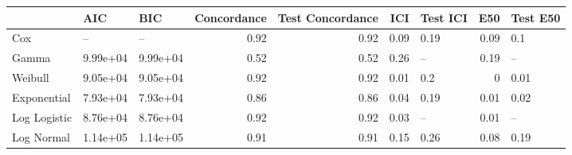 \begin{table*}
\centering
\label{tab:afr_models}
\begin{tabular}{lllrrrlrl}
\toprule
 & AIC & BIC & Concordance & Test Concordance & ICI & Test ICI & E50 & Test E50 \\
\midrule
Cox & -- & -- & 0.92 & 0.92 & 0.09 & 0.19 & 0.09 & 0.1 \\
Gamma & 9.99e+04 & 9.99e+04 & 0.52 & 0.52 & 0.26 & -- & 0.19 & -- \\
Weibull & 9.05e+04 & 9.05e+04 & 0.92 & 0.92 & 0.01 & 0.2 & 0 & 0.01 \\
Exponential & 7.93e+04 & 7.93e+04 & 0.86 & 0.86 & 0.04 & 0.19 & 0.01 & 0.02 \\
Log Logistic & 8.76e+04 & 8.76e+04 & 0.92 & 0.92 & 0.03 & -- & 0.01 & -- \\
Log Normal & 1.14e+05 & 1.14e+05 & 0.91 & 0.91 & 0.15 & 0.26 & 0.08 & 0.19 \\
\bottomrule
\end{tabular}
\end{table*}

